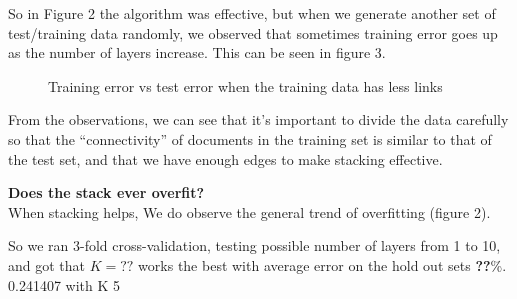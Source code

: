 \documentclass[a4paper,11pt]{article}
\begin{document}
So in Figure 2 the algorithm was effective, but when we generate
another set of test/training data randomly, we observed that sometimes
training error goes up as the number of layers increase. This can be
seen in figure 3.
\begin{figure}[h!]
  \caption{Training error vs test error when the training data has
    less links}
  \centering
\end{figure}

From the observations, we can see that it's important to divide the
data carefully so that the ``connectivity'' of documents in the
training set is similar to that of the test set, and that we have
enough edges to make stacking effective. 

\textbf{Does the stack ever overfit?}\\
When stacking helps, We do observe the general trend of overfitting
(figure 2).

So we ran 3-fold cross-validation, testing possible number of layers
from 1 to 10, and got that $K=\mathbf{??}$ works the best with average error on
the hold out sets \textbf{??}\%.
 0.241407 with K 5
\end{document}
